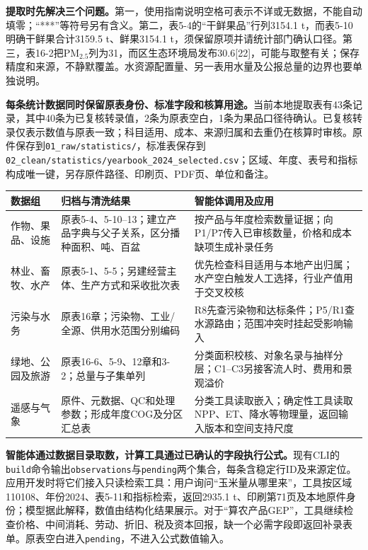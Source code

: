 \documentclass[12pt,a4paper,fontset=fandol]{ctexart}
\newcommand{\file}[1]{\nolinkurl{#1}}
\begin{document}
\textbf{提取时先解决三个问题。}第一，使用指南说明空格可表示不详或无数据，不能自动填零；“***”等符号另有含义。第二，表5-4的“干鲜果品”行列3154.1 t，而表5-10明确干鲜果合计3159.5 t、鲜果3154.1 t，须保留原项并请统计部门确认口径。第三，表16-2把PM$_{2.5}$列为31，而区生态环境局发布30.6[22]，可能与取整有关；保存精度和来源，不静默覆盖。水资源配置量、另一表用水量及公报总量的边界也要单独说明。

\textbf{每条统计数据同时保留原表身份、标准字段和核算用途。}当前本地提取表有43条记录，其中40条为已复核转录值，2条为原表空白，1条为果品口径待确认。已复核转录仅表示数值与原表一致；科目适用、成本、来源归属和去重仍在核算时审核。原件保存到\file{01_raw/statistics/}，标准表保存到\file{02_clean/statistics/yearbook_2024_selected.csv}；区域、年度、表号和指标构成唯一键，另存原件路径、印刷页、PDF页、单位和备注。

\begin{longtable}{P{2.5cm}P{4.9cm}P{5.6cm}}
\toprule 数据组 & 归档与清洗结果 & 智能体调用及应用 \\\midrule\endhead
作物、果品、设施 & 原表5-4、5-10--13；建立产品字典与父子关系，区分播种面积、吨、百盆 & 按产品与年度检索数量证据；向P1/P7传入已审核数量，价格和成本缺项生成补录任务 \\
林业、畜牧、水产 & 原表5-1、5-5；另建经营主体、生产方式和采收批次表 & 优先检查科目适用与本地产出归属；水产空白触发人工选择，行业产值用于交叉校核 \\
污染与水务 & 原表16章；污染物、工业/全源、供用水范围分别编码 & R8先查污染物和达标条件；P5/R1查水源路由；范围冲突时挂起受影响输入 \\
绿地、公园及旅游 & 原表16-6、5-9、12章和3-2；总量与子集单列 & 分类面积校核、对象名录与抽样分层；C1--C3另接客流人时、费用和景观溢价 \\
遥感与气象 & 原件、元数据、QC和处理参数；形成年度COG及分区汇总表 & 分类工具读取嵌入；确定性工具读取NPP、ET、降水等物理量，返回输入版本和空间支持尺度 \\
\bottomrule
\end{longtable}

\textbf{智能体通过数据目录取数，计算工具通过已确认的字段执行公式。}现有CLI的\file{build}命令输出\file{observations}与\file{pending}两个集合，每条含稳定行ID及来源定位。应用开发时将它们接入只读检索工具：用户询问“玉米量从哪里来”，工具按区域110108、年份2024、表5-11和指标检索，返回2935.1 t、印刷第71页及本地原件身份；模型据此解释，数值由结构化结果展示。对于“算农产品GEP”，工具继续检查价格、中间消耗、劳动、折旧、税及资本回报，缺一个必需字段即返回补录表单。原表空白进入\file{pending}，不进入公式数值输入。
\end{document}
